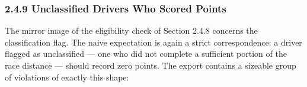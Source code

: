 \documentclass[
]{article}
\begin{document}
\newpage

\subsubsection{2.4.9 Unclassified Drivers Who Scored
Points}\label{unclassified-drivers-who-scored-points}

The mirror image of the eligibility check of Section 2.4.8 concerns the
classification flag. The naive expectation is again a strict
correspondence: a driver flagged as unclassified --- one who did not
complete a sufficient portion of the race distance --- should record
zero points. The export contains a sizeable group of violations of
exactly this shape:

\begin{table}[!h]
\centering\begingroup\fontsize{8}{10}\selectfont


\end{table}
\end{document}
